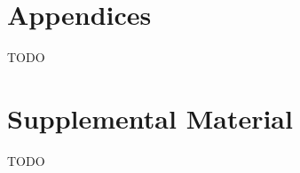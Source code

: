 \documentclass[11pt,a4paper]{article}
\begin{document}





\appendix

\section{Appendices}
TODO

\section{Supplemental Material}
\label{sec:supplemental}
TODO
\end{document}
